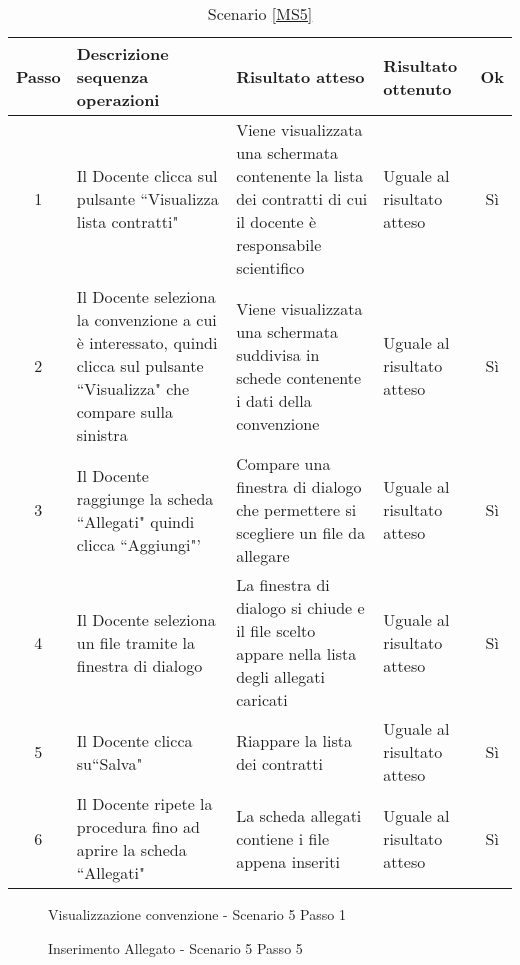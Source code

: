  {
 \footnotesize
  \begin{longtable}{|c|p{3cm}|p{3cm}|p{3cm}|c|}
     \caption{Scenario \ref{MS5}}\\
    \hline
    Passo & Descrizione sequenza operazioni & Risultato atteso & Risultato ottenuto & Ok\\
    \hline
    1 & Il Docente clicca sul pulsante ``Visualizza lista contratti" & Viene visualizzata una schermata contenente la lista dei contratti di cui il docente è responsabile scientifico& Uguale 
      al risultato atteso& Sì\\
    \hline
    2 &Il Docente seleziona la convenzione a cui è interessato, quindi clicca sul pulsante ``Visualizza" che compare sulla sinistra& Viene visualizzata una schermata suddivisa in schede contenente i dati della convenzione & Uguale al risultato atteso & Sì \\
    \hline
     3 & Il Docente raggiunge la scheda ``Allegati" quindi clicca ``Aggiungi"'& Compare una finestra di dialogo che permettere si scegliere un file da allegare & Uguale al risultato atteso & Sì \\
    \hline
    4 & Il Docente seleziona un file tramite la finestra di dialogo & La finestra di dialogo si chiude e il file scelto appare nella lista degli allegati caricati & Uguale al risultato atteso & Sì\\
    \hline
    5 & Il Docente clicca su``Salva" & Riappare la lista dei contratti & Uguale al risultato atteso & Sì\\
    \hline
    6 & Il Docente ripete la procedura fino ad aprire la scheda ``Allegati" & La scheda allegati contiene i file appena inseriti & Uguale al risultato atteso & Sì\\    
    \hline
\end{longtable}

}

\begin{figure}
	\centering
	\caption{Visualizzazione convenzione - Scenario 5 Passo 1}
	\label{tabDatiVisualizzazione}
\end{figure}

\begin{figure}
	\centering
	\caption{Inserimento Allegato - Scenario 5 Passo 5}
	\label{allegatiDopoInserimento}
\end{figure}


